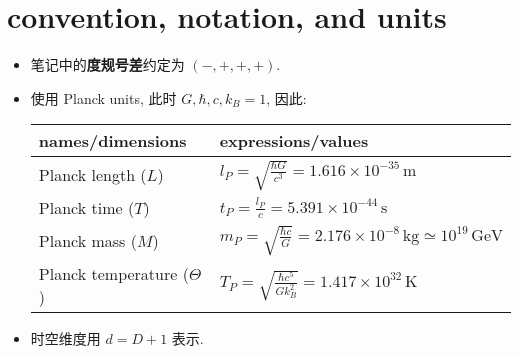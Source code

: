 \chapter*{convention, notation, and units}
\begin{itemize}
	\item 笔记中的\textbf{度规号差}约定为 $\boldsymbol{(-, +, +, +)}$.
	
	\item 使用 Planck units, 此时 $G, \hbar, c, k_B = 1$, 因此:
	
	\begin{center}
		\begin{tabularx}{\linewidth}{XX}
			\toprule 
			names/dimensions & expressions/values \\
			\midrule 
			Planck length ($L$) & $l_P = \sqrt{\frac{\hbar G}{c^3}} = 1.616 \times 10^{- 35} \, \text{m}$ \\
			Planck time ($T$) & $t_P = \frac{l_P}{c} = 5.391 \times 10^{- 44} \, \text{s}$ \\
			Planck mass ($M$) & $m_P = \sqrt{\frac{\hbar c}{G}} = 2.176 \times 10^{- 8} \, \text{kg} \simeq 10^{19} \, \text{GeV}$ \\
			Planck temperature ($\Theta$) & $T_P = \sqrt{\frac{\hbar c^5}{G k_B^2}} = 1.417 \times 10^{32} \, \text{K}$ \\
			\bottomrule
		\end{tabularx}
	\end{center}
	
	\item 时空维度用 $d = D + 1$ 表示.
\end{itemize}

